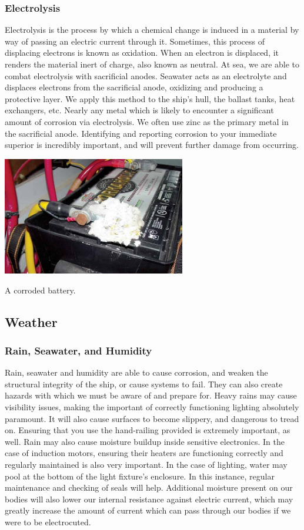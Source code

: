\documentclass[11pt,a4paper]{article}
\begin{document}
\subsubsection{Electrolysis}
Electrolysis is the process by which a chemical change is induced in a material by way of passing an electric current through it. Sometimes, this process of displacing electrons is known as oxidation. When an electron is displaced, it renders the material inert of charge, also known as neutral. At sea, we are able to combat electrolysis with sacrificial anodes. Seawater acts as an electrolyte and displaces electrons from the sacrificial anode, oxidizing and producing a protective layer. We apply this method to the ship’s hull, the ballast tanks, heat exchangers, etc. Nearly any metal which is likely to encounter a significant amount of corrosion via electrolysis. We often use zinc as the primary metal in the sacrificial anode. Identifying and reporting corrosion to your immediate superior is incredibly important, and will prevent further damage from occurring.
\begin{center}
\includegraphics[width=8cm]{electrolysis}\par
A corroded battery.
\end{center}
\subsection{Weather}
\subsubsection{Rain, Seawater, and Humidity}
Rain, seawater and humidity are able to cause corrosion, and weaken the structural integrity of the ship, or cause systems to fail. They can also create hazards with which we must be aware of and prepare for. Heavy rains may cause visibility issues, making the important of correctly functioning lighting absolutely paramount. It will also cause surfaces to become slippery, and dangerous to tread on. Ensuring that you use the hand-railing provided is extremely important, as well. Rain may also cause moisture buildup inside sensitive electronics. In the case of induction motors, ensuring their heaters are functioning correctly and regularly maintained is also very important. In the case of lighting, water may pool at the bottom of the light fixture’s enclosure. In this instance, regular maintenance and checking of seals will help. Additional moisture present on our bodies will also lower our internal resistance against electric current, which may greatly increase the amount of current which can pass through our bodies if we were to be electrocuted.
\end{document}
